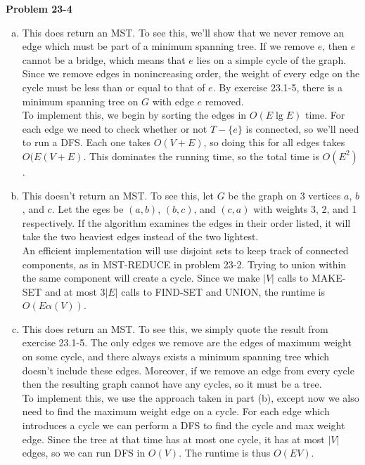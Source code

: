 \documentclass{article}
\begin{document}
\noindent\textbf{Problem 23-4}\\
\begin{enumerate}[a.]
\item This does return an MST.  To see this, we'll show that we never remove an edge which must be part of a minimum spanning tree.  If we remove $e$, then $e$ cannot be a bridge, which means that $e$ lies on a simple cycle of the graph.  Since we remove edges in nonincreasing order, the weight of every edge on the cycle must be less than or equal to that of $e$. By exercise 23.1-5, there is a minimum spanning tree on $G$ with edge $e$ removed.  \\

To implement this, we begin by sorting the edges in $O(E\lg E)$ time.  For each edge we need to check whether or not $T-\{e\}$ is connected, so we'll need to run a DFS.  Each one takes $O(V+E)$, so doing this for all edges takes $O(E(V+E)$.  This dominates the running time, so the total time is $O(E^2)$.\\

\item This doesn't return an MST.  To see this, let $G$ be the graph on 3 vertices $a$, $b$, and $c$.  Let the eges be $(a,b)$, $(b,c)$, and $(c,a)$ with weights 3, 2, and 1 respectively.  If the algorithm examines the edges in their order listed, it will take the two heaviest edges instead of the two lightest. \\

An efficient implementation will use disjoint sets to keep track of connected components, as in MST-REDUCE in problem 23-2.  Trying to union within the same component will create a cycle.  Since we make $|V|$ calls to MAKE-SET and at most $3|E|$ calls to FIND-SET and UNION, the runtime is $O(E\alpha(V))$.\\

\item This does return an MST.  To see this, we simply quote the result from exercise 23.1-5.  The only edges we remove are the edges of maximum weight on some cycle, and there always exists a minimum spanning tree which doesn't include these edges.  Moreover, if we remove an edge from every cycle then the resulting graph cannot have any cycles, so it must be a tree.\\

To implement this, we use the approach taken in part (b), except now we also need to find the maximum weight edge on a cycle. For each edge which introduces a cycle we can perform a DFS to find the cycle and max weight edge.  Since the tree at that time has at most one cycle, it has at most $|V|$ edges, so we can run DFS in $O(V)$.  The runtime is thus $O(EV)$.\\

\end{enumerate}
\end{document}

